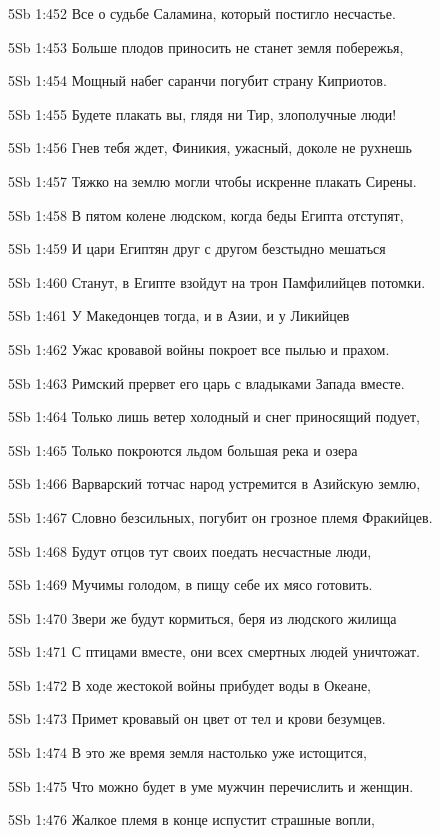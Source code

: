 \vs 5Sb 1:452 Все о судьбе Саламина, который постигло несчастье. 

\vs 5Sb 1:453 Больше плодов приносить не станет земля побережья, 

\vs 5Sb 1:454 Мощный набег саранчи погубит страну Киприотов.

\vs 5Sb 1:455 Будете плакать вы, глядя ни Тир, злополучные люди! 

\vs 5Sb 1:456 Гнев тебя ждет, Финикия, ужасный, доколе не рухнешь 

\vs 5Sb 1:457 Тяжко на землю  могли чтобы искренне плакать Сирены.

\vs 5Sb 1:458 В пятом колене людском, когда беды Египта отступят, 

\vs 5Sb 1:459 И цари Египтян друг с другом безстыдно мешаться 

\vs 5Sb 1:460 Станут, в Египте взойдут на трон Памфилийцев потомки. 

\vs 5Sb 1:461 У Македонцев тогда, и в Азии, и у Ликийцев 

\vs 5Sb 1:462 Ужас кровавой войны покроет все пылью и прахом. 

\vs 5Sb 1:463 Римский прервет его царь с владыками Запада вместе.

\vs 5Sb 1:464 Только лишь ветер холодный и снег приносящий подует,

\vs 5Sb 1:465 Только покроются льдом большая река и озера  

\vs 5Sb 1:466 Варварский тотчас народ устремится в Азийскую землю, 

\vs 5Sb 1:467 Словно безсильных, погубит он грозное племя Фракийцев. 

\vs 5Sb 1:468 Будут отцов тут своих поедать несчастные люди, 

\vs 5Sb 1:469 Мучимы голодом, в пищу себе их мясо готовить. 

\vs 5Sb 1:470 Звери же будут кормиться, беря из людского жилища  

\vs 5Sb 1:471 С птицами вместе, они всех смертных людей уничтожат. 

\vs 5Sb 1:472 В ходе жестокой войны прибудет воды в Океане, 

\vs 5Sb 1:473 Примет кровавый он цвет от тел и крови безумцев. 

\vs 5Sb 1:474 В это же время земля настолько уже истощится, 

\vs 5Sb 1:475 Что можно будет в уме мужчин перечислить и женщин.

\vs 5Sb 1:476 Жалкое племя в конце испустит страшные вопли, 

